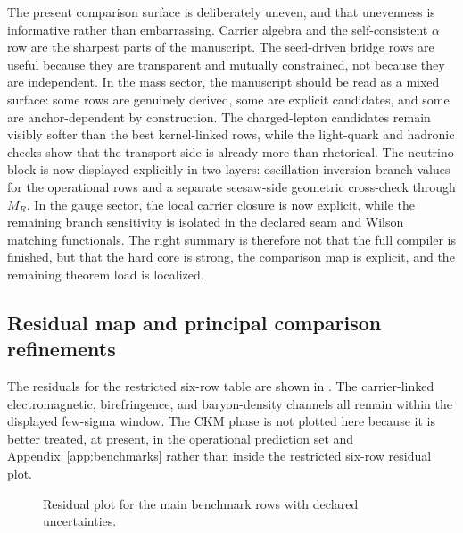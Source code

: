 \documentclass[11pt,a4paper]{article}
\theoremstyle{definition}
\theoremstyle{remark}
\begin{document}
The present comparison surface is deliberately uneven, and that unevenness is informative rather than embarrassing. Carrier algebra and the self-consistent $\alpha$ row are the sharpest parts of the manuscript. The seed-driven bridge rows are useful because they are transparent and mutually constrained, not because they are independent. In the mass sector, the manuscript should be read as a mixed surface: some rows are genuinely derived, some are explicit candidates, and some are anchor-dependent by construction. The charged-lepton candidates remain visibly softer than the best kernel-linked rows, while the light-quark and hadronic checks show that the transport side is already more than rhetorical. The neutrino block is now displayed explicitly in two layers: oscillation-inversion branch values for the operational rows and a separate seesaw-side geometric cross-check through $M_R$. In the gauge sector, the local carrier closure is now explicit, while the remaining branch sensitivity is isolated in the declared seam and Wilson matching functionals. The right summary is therefore not that the full compiler is finished, but that the hard core is strong, the comparison map is explicit, and the remaining theorem load is localized.

\subsection{Residual map and principal comparison refinements}

The residuals for the restricted six-row table are shown in . The carrier-linked electromagnetic, birefringence, and baryon-density channels all remain within the displayed few-sigma window. The CKM phase is not plotted here because it is better treated, at present, in the operational prediction set and Appendix~\ref{app:benchmarks} rather than inside the restricted six-row residual plot.

\begin{figure}[t]
\centering
{}
\caption{Residual plot for the main benchmark rows with declared uncertainties.}
\label{fig:residual-plot}
\end{figure}
\end{document}
